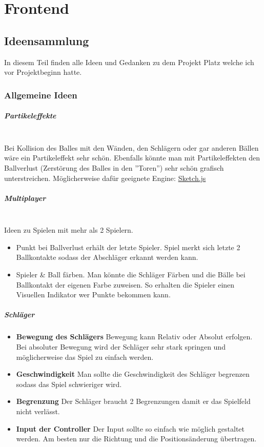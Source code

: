 \chapter{Frontend}
\section{Ideensammlung}
In diesem Teil finden alle Ideen und Gedanken zu dem Projekt Platz welche ich vor Projektbeginn hatte.
\subsection{Allgemeine Ideen}
\paragraph{Partikeleffekte}
\mbox{}\\
Bei Kollision des Balles mit den Wänden, den Schlägern oder gar anderen Bällen wäre ein Partikeleffekt sehr schön.
\newline
Ebenfalls könnte man mit Partikeleffekten den Ballverlust (Zerstörung des Balles in den ''Toren'') sehr schön grafisch unterstreichen.
\newline
Möglicherweise dafür geeignete Engine:
\href{http://soulwire.github.io/sketch.js/}{Sketch.js}
\paragraph{Multiplayer}
\mbox{}\\
Ideen zu Spielen mit mehr als 2 Spielern.
\begin{itemize}
	\item Punkt bei Ballverlust erhält der letzte Spieler. Spiel merkt sich letzte 2 Ballkontakte sodass der Abschläger erkannt werden kann.
	\item Spieler \& Ball färben. Man könnte die Schläger Färben und die Bälle bei Ballkontakt der eigenen Farbe zuweisen. So erhalten die Spieler einen Visuellen Indikator wer Punkte bekommen kann.
\end{itemize}
\newpage
\paragraph{Schläger}
\begin{itemize}
\item
\textbf{Bewegung des Schlägers} Bewegung kann Relativ oder Absolut erfolgen. Bei absoluter Bewegung wird der Schläger sehr stark springen und möglicherweise das Spiel zu einfach werden.
\item
\textbf{Geschwindigkeit} Man sollte die Geschwindigkeit des Schläger begrenzen sodass das Spiel  schwieriger wird.
\item
\textbf{Begrenzung} Der Schläger braucht 2 Begrenzungen damit er das Spielfeld nicht verlässt.
\item
\textbf{Input der Controller} Der Input sollte so einfach wie möglich gestaltet werden. Am besten nur die Richtung und die Positionsänderung übertragen.
\end{itemize}
